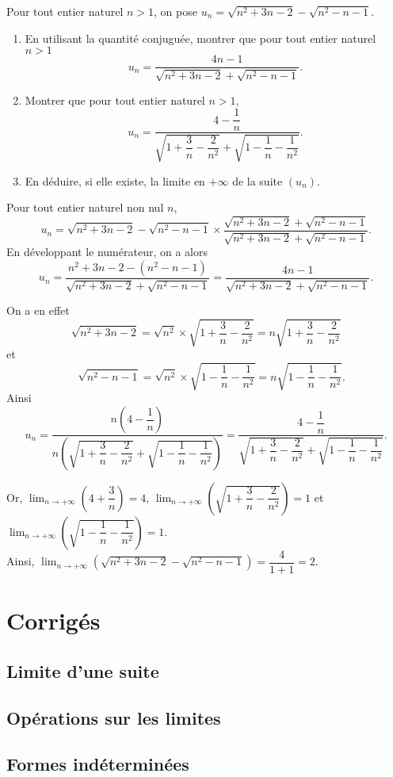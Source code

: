 \documentclass[11pt,fleqn]{book} %
\begin{document}
\begin{exercise}[topic=lim03]Pour tout entier naturel $n>1$, on pose $ u_n = \sqrt{n^2+3n-2}-\sqrt{n^2-n-1}$.

\begin{enumerate}
\item En utilisant la quantité conjuguée, montrer que pour tout entier naturel $n>1$
\[ u_n=\dfrac{4n-1}{ \sqrt{n^2+3n-2}+\sqrt{n^2-n-1}}.\]
\item Montrer que pour tout entier naturel $n>1$, 
\[u_n = \dfrac{4-\dfrac{1}{n}}{\sqrt{1+\dfrac{3}{n}-\dfrac{2}{n^2}}+\sqrt{1-\dfrac{1}{n}-\dfrac{1}{n^2}}}.\]
\item En déduire, si elle existe, la limite en $+\infty$ de la suite $(u_n)$.
\end{enumerate}\end{exercise}
\begin{solution}Pour tout entier naturel non nul $n$,  
\[ u_n=  \sqrt{n^2+3n-2}-\sqrt{n^2-n-1} \times \dfrac{ \sqrt{n^2+3n-2}+\sqrt{n^2-n-1}}{ \sqrt{n^2+3n-2}+\sqrt{n^2-n-1}}.\]
En développant le numérateur, on a alors
\[u_n= \dfrac{n^2+3n-2-(n^2-n-1)}{ \sqrt{n^2+3n-2}+\sqrt{n^2-n-1}}=\dfrac{4n-1}{ \sqrt{n^2+3n-2}+\sqrt{n^2-n-1}}.\]

On a en effet \[\sqrt{n^2+3n-2}=\sqrt{n^2} \times \sqrt{1+\dfrac{3}{n}-\dfrac{2}{n^2}}=n\sqrt{1+\dfrac{3}{n}-\dfrac{2}{n^2}}\]
et
\[\quad\sqrt{n^2-n-1}=\sqrt{n^2} \times \sqrt{1-\dfrac{1}{n}-\dfrac{1}{n^2}}=n \sqrt{1-\dfrac{1}{n}-\dfrac{1}{n^2}}.\]
Ainsi
\[u_n=\dfrac{n\left(4-\dfrac{1}{n}\right)}{n\left(\sqrt{1+\dfrac{3}{n}-\dfrac{2}{n^2}}+\sqrt{1-\dfrac{1}{n}-\dfrac{1}{n^2}}\right)} = \dfrac{4-\dfrac{1}{n}}{\sqrt{1+\dfrac{3}{n}-\dfrac{2}{n^2}}+\sqrt{1-\dfrac{1}{n}-\dfrac{1}{n^2}}}.\]

Or,  $\displaystyle \lim_{n \to +\infty}\left(4+\dfrac{3}{n}\right)=4$,   $\displaystyle \lim_{n \to +\infty} \left(\sqrt{1+\dfrac{3}{n}-\dfrac{2}{n^2}}\right)=1$ et $\displaystyle \lim_{n \to +\infty}\left(\sqrt{1-\dfrac{1}{n}-\dfrac{1}{n^2}}\right)=1$.\\ Ainsi,  $\displaystyle \lim_{n \to +\infty} \left(\sqrt{n^2+3n-2}-\sqrt{n^2-n-1}\right)=\dfrac{4}{1+1}=2$.\end{solution}






\chapter{Corrigés}
\setcounter{section}{0}
\section*{Limite d'une suite}
\printsolutions[collection={lim01}, headings={false} ]


\section*{Opérations sur les limites}

\printsolutions[collection={lim02}, headings={false} ]


\section*{Formes indéterminées}
\printsolutions[collection={lim03}, headings={false} ]
\end{document}
